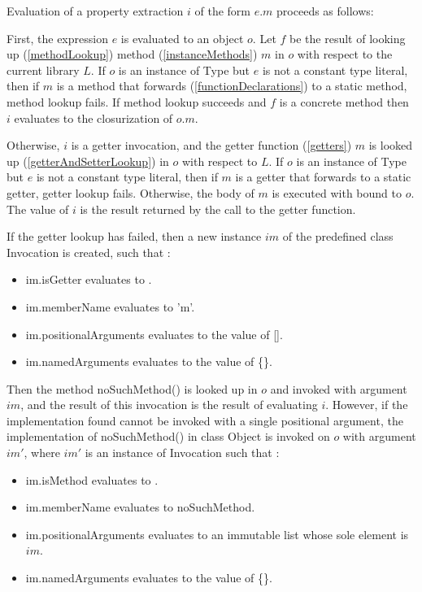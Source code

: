 \documentclass{article}
\newcommand{\code}[1]{{\sf #1}}
\begin{document}
\LMHash{}
Evaluation of a property extraction $i$ of the form $e.m$ proceeds as follows:

\LMHash{}
First, the expression $e$ is evaluated to an object $o$. Let $f$ be the result of looking up (\ref{methodLookup}) method  (\ref{instanceMethods}) $m$ in $o$ with respect to the current library $L$.  If $o$ is an instance of \code{Type} but $e$ is not a constant type literal, then if $m$ is a method that forwards (\ref{functionDeclarations}) to a static method,  method lookup fails. If method lookup succeeds and $f$ is a concrete method then $i$ evaluates to the closurization of $o.m$.  

\LMHash{}
Otherwise, $i$ is a getter invocation, and the getter function (\ref{getters}) $m$ is looked up (\ref{getterAndSetterLookup}) in $o$  with respect to $L$. If $o$ is an instance of \code{Type} but $e$ is not a constant type literal, then if $m$ is a getter that forwards  to a static getter,  getter lookup fails. Otherwise, the body of $m$ is executed with \THIS{} bound to $o$.  The value of $i$ is the result returned by the call to the getter function. 

\LMHash{}
If the getter lookup has failed, then a new instance $im$  of the predefined class  \code{Invocation}  is created, such that :
\begin{itemize}
\item  \code{im.isGetter} evaluates to \code{\TRUE{}}.
\item  \code{im.memberName} evaluates to \code{'m'}.
\item \code{im.positionalArguments} evaluates to the value of \code{\CONST{} []}.
\item \code{im.namedArguments} evaluates to the value of \code{\CONST{} \{\}}.
\end{itemize}
Then the method \code{noSuchMethod()} is looked up in $o$ and invoked  with argument $im$, and the result of this invocation is the result of evaluating $i$. However, if the implementation found cannot be invoked with a single positional argument, the implementation  of \code{noSuchMethod()} in class \code{Object} is invoked on $o$ with argument $im'$, where $im'$ is an instance of \code{Invocation} such that :
\begin{itemize}
\item  \code{im.isMethod} evaluates to \code{\TRUE{}}.
\item  \code{im.memberName} evaluates to \code{noSuchMethod}.
\item \code{im.positionalArguments} evaluates to an immutable list whose sole element is  $im$.
\item \code{im.namedArguments} evaluates to the value of \code{\CONST{} \{\}}.
\end{itemize}
\end{document}
